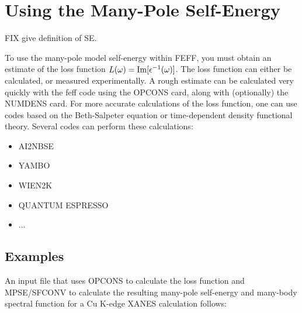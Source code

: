 \documentclass[11pt,oneside]{report} %
\renewcommand{\htmlref}[2]{\hyperlink{#2}{#1}}
\renewcommand{\htmlref}[2]{{#1}} %
\begin{document}

\section{Using the Many-Pole Self-Energy}
\label{Sec:MPSE}
FIX give definition of SE.

To use the many-pole model self-energy within FEFF, you must obtain an
estimate of the loss function $L(\omega) = {\rm
  Im}[\epsilon^{-1}(\omega)]$. The loss function can either be
calculated, or measured experimentally. A rough estimate can be
calculated very quickly with the feff code using the
\htmlref{OPCONS}{card:opc} 
card, along with (optionally) the \htmlref{NUMDENS}{card:num} card.
For more accurate calculations of the loss function, one can use codes
based on the Beth-Salpeter equation or time-dependent density
functional theory. Several codes can perform these calculations:
\begin{itemize} \tightlist
  \item{AI2NBSE}
  \item{YAMBO}
  \item{WIEN2K}
  \item{QUANTUM ESPRESSO}
  \item ...
\end{itemize}

\subsection{Examples}
An input file that uses OPCONS to calculate the loss function
and MPSE/SFCONV to calculate the resulting many-pole self-energy and
many-body spectral function for a Cu K-edge XANES calculation
follows:
\end{document}
